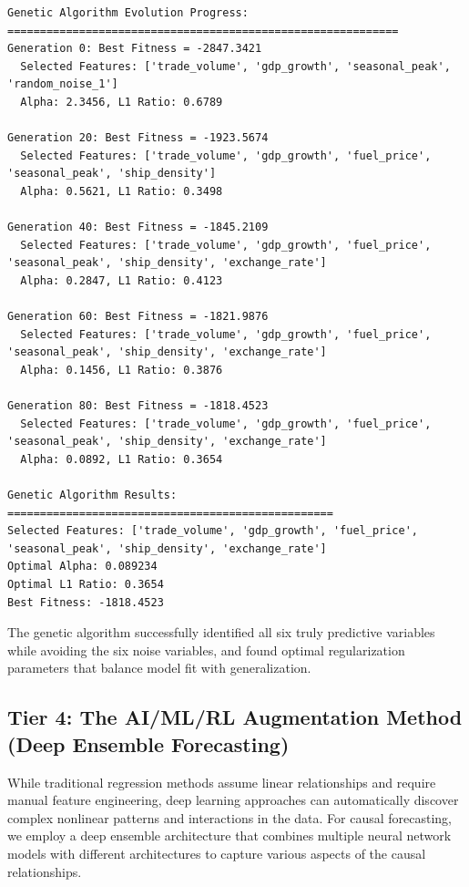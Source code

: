\documentclass{article}
\begin{document}
\begin{verbatim}
Genetic Algorithm Evolution Progress:
============================================================
Generation 0: Best Fitness = -2847.3421
  Selected Features: ['trade_volume', 'gdp_growth', 'seasonal_peak', 'random_noise_1']
  Alpha: 2.3456, L1 Ratio: 0.6789

Generation 20: Best Fitness = -1923.5674
  Selected Features: ['trade_volume', 'gdp_growth', 'fuel_price', 'seasonal_peak', 'ship_density']
  Alpha: 0.5621, L1 Ratio: 0.3498

Generation 40: Best Fitness = -1845.2109
  Selected Features: ['trade_volume', 'gdp_growth', 'fuel_price', 'seasonal_peak', 'ship_density', 'exchange_rate']
  Alpha: 0.2847, L1 Ratio: 0.4123

Generation 60: Best Fitness = -1821.9876
  Selected Features: ['trade_volume', 'gdp_growth', 'fuel_price', 'seasonal_peak', 'ship_density', 'exchange_rate']
  Alpha: 0.1456, L1 Ratio: 0.3876

Generation 80: Best Fitness = -1818.4523
  Selected Features: ['trade_volume', 'gdp_growth', 'fuel_price', 'seasonal_peak', 'ship_density', 'exchange_rate']
  Alpha: 0.0892, L1 Ratio: 0.3654

Genetic Algorithm Results:
==================================================
Selected Features: ['trade_volume', 'gdp_growth', 'fuel_price', 'seasonal_peak', 'ship_density', 'exchange_rate']
Optimal Alpha: 0.089234
Optimal L1 Ratio: 0.3654
Best Fitness: -1818.4523
\end{verbatim}

The genetic algorithm successfully identified all six truly predictive variables while avoiding the six noise variables, and found optimal regularization parameters that balance model fit with generalization.

\subsection{Tier 4: The AI/ML/RL Augmentation Method (Deep Ensemble Forecasting)}

While traditional regression methods assume linear relationships and require manual feature engineering, deep learning approaches can automatically discover complex nonlinear patterns and interactions in the data. For causal forecasting, we employ a deep ensemble architecture that combines multiple neural network models with different architectures to capture various aspects of the causal relationships.
\end{document}
